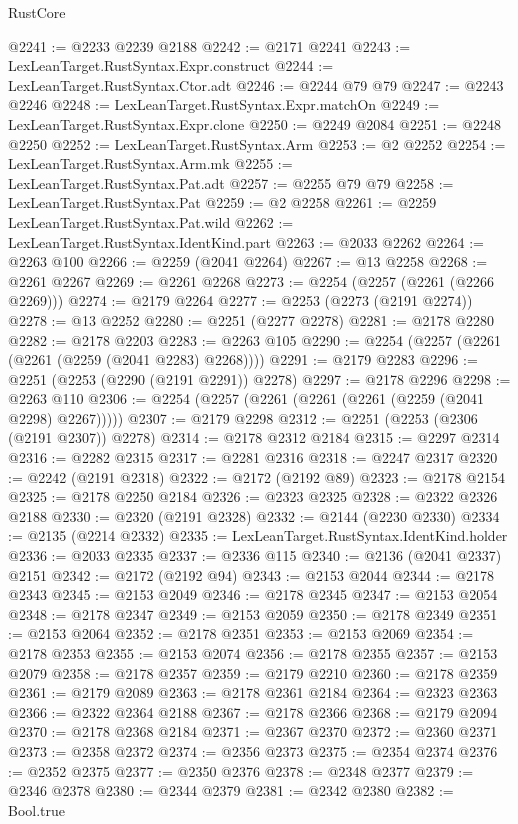 \begin{lexlean}{RustCore}
\begin{coremodule}
@2241 := @2233 @2239 @2188
@2242 := @2171 @2241
@2243 := LexLeanTarget.RustSyntax.Expr.construct
@2244 := LexLeanTarget.RustSyntax.Ctor.adt
@2246 := @2244 @79 @79
@2247 := @2243 @2246
@2248 := LexLeanTarget.RustSyntax.Expr.matchOn
@2249 := LexLeanTarget.RustSyntax.Expr.clone
@2250 := @2249 @2084
@2251 := @2248 @2250
@2252 := LexLeanTarget.RustSyntax.Arm
@2253 := @2 @2252
@2254 := LexLeanTarget.RustSyntax.Arm.mk
@2255 := LexLeanTarget.RustSyntax.Pat.adt
@2257 := @2255 @79 @79
@2258 := LexLeanTarget.RustSyntax.Pat
@2259 := @2 @2258
@2261 := @2259 LexLeanTarget.RustSyntax.Pat.wild
@2262 := LexLeanTarget.RustSyntax.IdentKind.part
@2263 := @2033 @2262
@2264 := @2263 @100
@2266 := @2259 (@2041 @2264)
@2267 := @13 @2258
@2268 := @2261 @2267
@2269 := @2261 @2268
@2273 := @2254 (@2257 (@2261 (@2266 @2269)))
@2274 := @2179 @2264
@2277 := @2253 (@2273 (@2191 @2274))
@2278 := @13 @2252
@2280 := @2251 (@2277 @2278)
@2281 := @2178 @2280
@2282 := @2178 @2203
@2283 := @2263 @105
@2290 := @2254 (@2257 (@2261 (@2261 (@2259 (@2041 @2283) @2268))))
@2291 := @2179 @2283
@2296 := @2251 (@2253 (@2290 (@2191 @2291)) @2278)
@2297 := @2178 @2296
@2298 := @2263 @110
@2306 := @2254 (@2257 (@2261 (@2261 (@2261 (@2259 (@2041 @2298) @2267)))))
@2307 := @2179 @2298
@2312 := @2251 (@2253 (@2306 (@2191 @2307)) @2278)
@2314 := @2178 @2312 @2184
@2315 := @2297 @2314
@2316 := @2282 @2315
@2317 := @2281 @2316
@2318 := @2247 @2317
@2320 := @2242 (@2191 @2318)
@2322 := @2172 (@2192 @89)
@2323 := @2178 @2154
@2325 := @2178 @2250 @2184
@2326 := @2323 @2325
@2328 := @2322 @2326 @2188
@2330 := @2320 (@2191 @2328)
@2332 := @2144 (@2230 @2330)
@2334 := @2135 (@2214 @2332)
@2335 := LexLeanTarget.RustSyntax.IdentKind.holder
@2336 := @2033 @2335
@2337 := @2336 @115
@2340 := @2136 (@2041 @2337) @2151
@2342 := @2172 (@2192 @94)
@2343 := @2153 @2044
@2344 := @2178 @2343
@2345 := @2153 @2049
@2346 := @2178 @2345
@2347 := @2153 @2054
@2348 := @2178 @2347
@2349 := @2153 @2059
@2350 := @2178 @2349
@2351 := @2153 @2064
@2352 := @2178 @2351
@2353 := @2153 @2069
@2354 := @2178 @2353
@2355 := @2153 @2074
@2356 := @2178 @2355
@2357 := @2153 @2079
@2358 := @2178 @2357
@2359 := @2179 @2210
@2360 := @2178 @2359
@2361 := @2179 @2089
@2363 := @2178 @2361 @2184
@2364 := @2323 @2363
@2366 := @2322 @2364 @2188
@2367 := @2178 @2366
@2368 := @2179 @2094
@2370 := @2178 @2368 @2184
@2371 := @2367 @2370
@2372 := @2360 @2371
@2373 := @2358 @2372
@2374 := @2356 @2373
@2375 := @2354 @2374
@2376 := @2352 @2375
@2377 := @2350 @2376
@2378 := @2348 @2377
@2379 := @2346 @2378
@2380 := @2344 @2379
@2381 := @2342 @2380
@2382 := Bool.true

\end{coremodule}
\end{lexlean}
